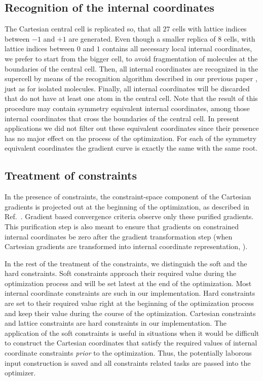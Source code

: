 \documentclass[prl,aps,preprint,superbib,12pt]{revtex4}
\begin{document}
\subsection{Recognition of the internal coordinates}
The Cartesian central cell is replicated so, that all $27$ 
cells with lattice indices between $-1$ and $+1$ are generated.
Even though a smaller replica of 8 cells, with lattice indices
between $0$ and $1$ contains all necessary local internal coordinates,
we prefer to start from the bigger cell, to avoid fragmentation
of molecules at the boundaries of the central cell.
Then, all internal coordinates are recognized in the supercell
by means of the recognition algorithm described in our previous paper
\cite{KNemeth04}, just as for isolated molecules.
Finally, all internal coordinates will be discarded that do not 
have at least one atom in the central cell. Note that the
result of this procedure may contain symmetry equivalent
internal coordinates, among those internal coordinates that cross
the boundaries of the central cell. In present applications
we did not filter out these equivalent coordinates since their
presence has no major effect on the process of the optimization. 
For each of the symmetry equivalent coordinates the gradient curve
is exactly the same with the same root.

\subsection{Treatment of constraints}
In the presence of constraints, the constraint-space
component of the Cartesian gradients is projected out 
at the beginning of the optimization, as described
in Ref.~. Gradient based convergence criteria
observe only these purified gradients. This purification 
step is also meant to ensure that gradients on constrained
internal coordinates be zero after the gradient transformation step
(when Cartesian gradients are transformed into internal coordinate
representation, \cite{PPulay77}).

In the rest of the treatment of the constraints, we distinguish
the soft and the hard constraints.
Soft constraints approach their required value during the
optimization process and will be set latest at the end of the
optimization. Most internal coordinate constraints are such
in our implementation. Hard constraints are set to their required
value right at the beginning of the optimization process and keep their
value during the course of the optimization. 
Cartesian constraints and lattice constraints are hard constraints 
in our implementation. 
The application of the soft constraints is
useful in situations when it would be difficult to construct the 
Cartesian coordinates that satisfy the required values of internal 
coordinate constraints {\it prior} to the optimization. 
Thus, the potentially laborous input construction
is saved and all constraints related tasks are passed into the 
optimizer.
\end{document}
